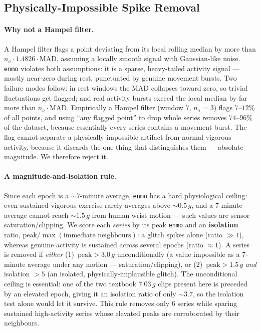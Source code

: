 \subsection{Physically-Impossible Spike Removal}
\paragraph{Why not a Hampel filter.} A Hampel filter flags a point deviating from its local rolling median by more than $n_\sigma\cdot1.4826\cdot\mathrm{MAD}$, assuming a locally smooth signal with Gaussian-like noise. \texttt{enmo} violates both assumptions: it is a sparse, heavy-tailed activity signal --- mostly near-zero during rest, punctuated by genuine movement bursts. Two failure modes follow: in rest windows the MAD collapses toward zero, so trivial fluctuations get flagged; and real activity bursts exceed the local median by far more than $n_\sigma\cdot\mathrm{MAD}$. Empirically a Hampel filter (window $7$, $n_\sigma=3$) flags $7$--$12\%$ of all points, and using ``any flagged point'' to drop whole series removes $74$--$96\%$ of the dataset, because essentially every series contains a movement burst. The flag cannot separate a physically-impossible artifact from normal vigorous activity, because it discards the one thing that distinguishes them --- absolute magnitude. We therefore reject it.

\paragraph{A magnitude-and-isolation rule.} Since each epoch is a $\sim$7-minute average, \texttt{enmo} has a hard physiological ceiling: even sustained vigorous exercise rarely averages above $\sim0.5\,g$, and a $7$-minute average cannot reach $\sim1.5\,g$ from human wrist motion --- such values are sensor saturation/clipping. We score each \emph{series} by its peak \texttt{enmo} and an \textbf{isolation} ratio, $\text{peak}/\max(\text{immediate neighbours})$: a glitch spikes alone (ratio $\gg 1$), whereas genuine activity is sustained across several epochs (ratio $\approx 1$). A series is removed if \emph{either} (1)~$\text{peak}>3.0\,g$ unconditionally (a value impossible as a $7$-minute average under any motion --- saturation/clipping), or (2)~$\text{peak}>1.5\,g$ \emph{and} isolation $>5$ (an isolated, physically-implausible glitch). The unconditional ceiling is essential: one of the two textbook $7.03\,g$ clips present here is preceded by an elevated epoch, giving it an isolation ratio of only $\sim3.7$, so the isolation test alone would let it survive. This rule removes only $6$ series while sparing sustained high-activity series whose elevated peaks are corroborated by their neighbours.

